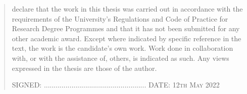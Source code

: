 \documentclass{mimosis-class/mimosis}
\numberwithin{equation}{chapter}
\begin{document}
\label{sec:orgec5948c}
\begin{singlespace}
\begin{quote}
 declare that the work in this thesis was carried out in accordance with the requirements of  the University's Regulations and Code of Practice for Research Degree Programmes and that it  has not been submitted for any other academic award. Except where indicated by specific  reference in the text, the work is the candidate's own work. Work done in collaboration with, or with the assistance of, others, is indicated as such. Any views expressed in the thesis are those of the author.

\vspace{1.5cm}
\noindent
\hspace{-0.75cm}\textsc{SIGNED: .................................................... DATE: 12th  May 2022}
\end{quote}
\end{singlespace}
\end{document}
